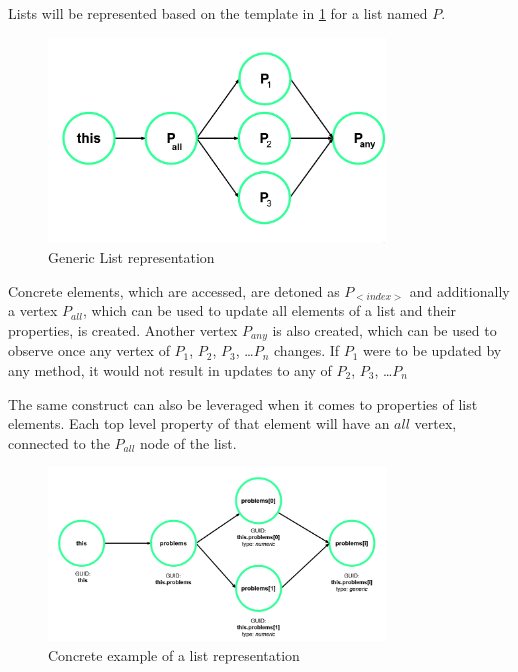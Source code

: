 Lists will be represented based on the template in \ref{fig:graph_list_generic} for a list named $P$.  %
\begin{figure}[H]
    \includegraphics[width=0.8\textwidth]{images/graph_list_generic.png}
     \caption{Generic List representation}
     \label{fig:graph_list_generic}
\end{figure}

Concrete elements, which are accessed, are detoned as $P_{<index>}$ and additionally a vertex $P_{all}$, which can be used to update all elements of a list\label{concept:why_create_list} and their properties, is created. Another vertex $P_{any}$ is also created, which can be used to observe once any vertex of $P_1$, $P_2$, $P_3$, \dots $P_n$ changes. If $P_1$ were to be updated by any method, it would not result in updates to any of $P_2$, $P_3$, \dots $P_n$

The same construct can also be leveraged when it comes to properties of list elements. Each top level property of that element will have an $all$ vertex, connected to the $P_{all}$ node of the list.  

\begin{figure}[H]
    \includegraphics[width=0.8\textwidth]{images/graph_list.png}
     \caption{Concrete example of a list representation}
     \label{fig:graph_list}
\end{figure}

